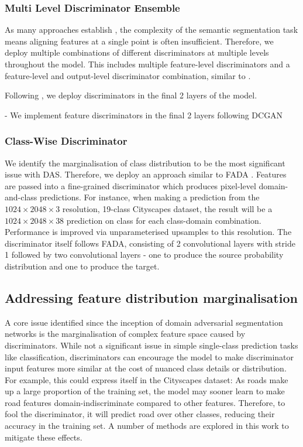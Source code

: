 \documentclass[a4paper,12pt]{report}
\begin{document}
\subsubsection{Multi Level Discriminator Ensemble}
As many approaches establish \cite{hoffman_fcns_2016} \cite{bermudez-chacon_domain-adaptive_2018}, the complexity of the semantic segmentation task means aligning features at a single point is often insufficient. Therefore, we deploy multiple combinations of different discriminators at multiple levels throughout the model. This includes multiple feature-level discriminators and a feature-level and output-level discriminator combination, similar to \cite{tsai_learning_2020}.

Following \cite{tsai_learning_2020}, we deploy discriminators in the final 2 layers of the model.

- We implement feature discriminators in the final 2 layers following DCGAN
\subsubsection{Class-Wise Discriminator}
We identify the marginalisation of class distribution to be the most significant issue with DAS. Therefore, we deploy an approach similar to FADA \cite{wang_classes_2020}. Features are passed into a fine-grained discriminator which produces pixel-level domain-and-class predictions. For instance, when making a prediction from the $1024 \times 2048 \times 3$ resolution, 19-class Cityscapes dataset, the result will be a $1024 \times 2048 \times 38$ prediction on class for each class-domain combination. Performance is improved via unparameterised upsamples to this resolution. The discriminator itself follows FADA, consisting of 2 convolutional layers with stride 1 followed by two convolutional layers - one to produce the source probability distribution and one to produce the target.

\subsection{Addressing feature distribution marginalisation}
A core issue identified since the inception of domain adversarial segmentation networks \cite{hoffman_fcns_2016} is the marginalisation of complex feature space caused by discriminators. While not a significant issue in simple single-class prediction tasks like classification, discriminators can encourage the model to make discriminator input features more similar at the cost of nuanced class details or distribution. For example, this could express itself in the Cityscapes dataset: As roads make up a large proportion of the training set, the model may sooner learn to make road features domain-indiscriminate compared to other features. Therefore, to fool the discriminator, it will predict road over other classes, reducing their accuracy in the training set. A number of methods are explored in this work to mitigate these effects.
\end{document}
